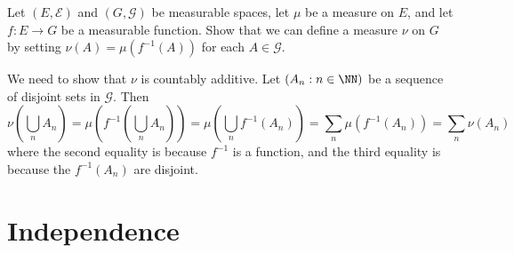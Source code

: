 \documentclass[11pt, headheight=30pt]{scrartcl}
\begin{document}
\pagebreak
\begin{prob*}
    Let $(E, \mathcal{E})$ and $(G, \mathcal{G})$ be measurable spaces,
    let $\mu$ be a measure on $E$, and let $f: E \to G$ be a measurable
    function. Show that we can define a measure $\nu$ on $G$ by setting
    $\nu(A) = \mu(f^{-1}(A))$ for each $A \in \mathcal{G}$.
\end{prob*}
We need to show that $\nu$ is countably additive. Let $(A_n : n\in \NN)$
be a sequence of disjoint sets in $\mathcal{G}$. Then
\[
    \nu\left(\bigcup_n A_n\right) = \mu\left(f^{-1}\left(\bigcup_n A_n\right)\right)
    = \mu\left(\bigcup_n f^{-1}(A_n)\right) = \sum_n \mu(f^{-1}(A_n)) = \sum_n \nu(A_n)
\]
where the second equality is because $f^{-1}$ is a function, and the
third equality is because the $f^{-1}(A_n)$ are disjoint.

\pagebreak
\section{Independence}
\end{document}
